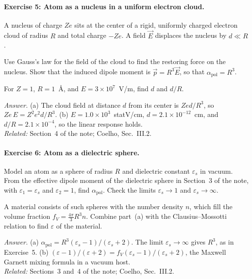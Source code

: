 \documentclass[11pt]{article}      %
\numberwithin{equation}{section}   %
\begin{document}
\paragraph{Exercise 5: Atom as a nucleus in a uniform electron cloud.}
A nucleus of charge $Ze$ sits at the center of a rigid, uniformly charged electron cloud of radius $R$ and total charge $-Ze$. A field $\vec E$ displaces the nucleus by $d \ll R$.
\begin{parts}
    \item Use Gauss's law for the field of the cloud to find the restoring force on the nucleus. Show that the induced dipole moment is $\vec p = R^3\vec E$, so that $\alpha_{\text{pol}} = R^3$.
    \item For $Z = 1$, $R = 1$~\AA, and $E = 3\times10^7$~V/m, find $d$ and $d/R$.
\end{parts}
\textit{Answer.} (a) The cloud field at distance $d$ from its center is $Zed/R^3$, so $Ze\,E = Z^2e^2d/R^3$. (b) $E = 1.0\times10^3$~statV/cm, $d = 2.1\times10^{-12}$~cm, and $d/R = 2.1\times10^{-4}$, so the linear response holds.\\
\textit{Related:} Section~4 of the note; Coelho, Sec.~III.2.

\paragraph{Exercise 6: Atom as a dielectric sphere.}
\begin{parts}
    \item Model an atom as a sphere of radius $R$ and dielectric constant $\varepsilon_s$ in vacuum. From the effective dipole moment of the dielectric sphere in Section~3 of the note, with $\varepsilon_1 = \varepsilon_s$ and $\varepsilon_2 = 1$, find $\alpha_{\text{pol}}$. Check the limits $\varepsilon_s \to 1$ and $\varepsilon_s \to \infty$.
    \item A material consists of such spheres with the number density $n$, which fill the volume fraction $f_V = \tfrac{4\pi}{3}R^3n$. Combine part~(a) with the Clausius--Mossotti relation to find $\varepsilon$ of the material.
\end{parts}
\textit{Answer.} (a) $\alpha_{\text{pol}} = R^3(\varepsilon_s - 1)/(\varepsilon_s + 2)$. The limit $\varepsilon_s \to \infty$ gives $R^3$, as in Exercise~5. (b) $(\varepsilon - 1)/(\varepsilon + 2) = f_V(\varepsilon_s - 1)/(\varepsilon_s + 2)$, the Maxwell Garnett mixing formula in a vacuum host.\\
\textit{Related:} Sections~3 and~4 of the note; Coelho, Sec.~III.2.
\end{document}
